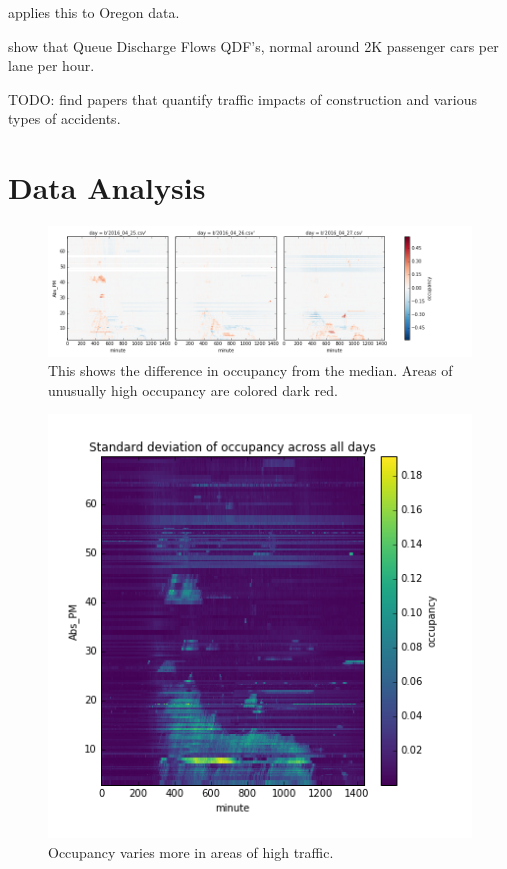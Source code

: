 \documentclass[12pt]{article}
\begin{document}
\cite{wieczorek2010techniques} applies this to Oregon data.

\cite{zhang2004some} show that Queue Discharge Flows QDF's, normal around 2K
passenger cars per lane per hour.

TODO: find papers that quantify traffic impacts of construction and various
types of accidents.

\section{Data Analysis}

\begin{figure}
    \includegraphics[scale=0.5]{../diffs.png}
    \caption{This shows the difference in occupancy from the median. Areas
    of unusually high occupancy are colored dark red.
    }
\end{figure}




\begin{figure}
    \includegraphics[scale=0.5]{../occ_sd.png}
    \caption{Occupancy varies more in areas of high traffic.}
\end{figure}
\end{document}
